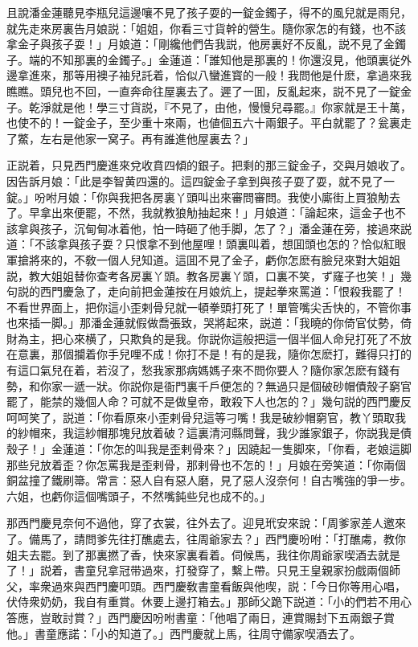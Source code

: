 且說潘金蓮聽見李瓶兒這邊嚷不見了孩子耍的一錠金鐲子，得不的風兒就是雨兒，就先走來房裏告月娘説：「姐姐，你看三寸貨幹的營生。隨你家怎的有錢，也不該拿金子與孩子耍！」月娘道：「剛纔他們告我説，他房裏好不反亂，説不見了金鐲子。端的不知那裏的金鐲子。」金蓮道：「誰知他是那裏的！你還沒見，他頭裏従外邊拿進來，那等用襖子袖兒託着，恰似八蠻進寳的一般！我問他是什麽，拿過來我瞧瞧。頭兒也不回，一直奔命往屋裏去了。遲了一囬，反亂起來，説不見了一錠金子。乾淨就是他！學三寸貨説，『不見了，由他，慢慢兒尋罷。』你家就是王十萬，也使不的！一錠金子，至少重十來兩，也値個五六十兩銀子。平白就罷了？瓮裏走了鱉，左右是他家一窝子。再有誰進他屋裏去？」

正説着，只見西門慶進來兌收賁四傾的銀子。把剩的那三錠金子，交與月娘收了。因告訴月娘：「此是李智黄四還的。這四錠金子拿到與孩子耍了耍，就不見了一錠。」吩咐月娘：「你與我把各房裏丫頭叫出來審問審問。我使小廝街上買狼觔去了。早拿出來便罷，不然，我就教狼觔抽起來！」月娘道：「論起來，這金子也不該拿與孩子，沉甸甸冰着他，怕一時砸了他手脚，怎了？」潘金蓮在旁，接過來説道：「不該拿與孩子耍？只恨拿不到他屋哩！頭裏叫着，想囬頭也怎的？恰似紅眼軍搶將來的，不敎一個人兒知道。這囬不見了金子，虧你怎麽有臉兒來對大姐姐説，教大姐姐替你查考各房裏丫頭。教各房裏丫頭，口裏不笑，ず窿子也笑！」幾句説的西門慶急了，走向前把金蓮按在月娘炕上，提起拳來罵道：「恨殺我罷了！不看世界面上，把你這小歪剌骨兒就一頓拳頭打死了！單管嘴尖舌快的，不管你事也來插一脚。」那潘金蓮就假做喬張致，哭將起來，説道：「我曉的你倚官仗勢，倚財為主，把心來横了，只欺負的是我。你説你這般把這一個半個人命兒打死了不放在意裏，那個攔着你手兒哩不成！你打不是！有的是我，隨你怎麽打，難得只打的有這口氣兒在着，若沒了，愁我家那病媽媽子來不問你要人？隨你家怎麽有錢有勢，和你家一遞一狀。你説你是衙門裏千戶便怎的？無過只是個破砂帽債殼子窮官罷了，能禁的幾個人命？可就不是做皇帝，敢殺下人也怎的？」幾句説的西門慶反呵呵笑了，説道：「你看原來小歪剌骨兒這等刁嘴！我是破紗帽窮官，教丫頭取我的紗帽來，我這紗帽那塊兒放着破？這裏清河縣問聲，我少誰家銀子，你説我是債殼子！」金蓮道：「你怎的叫我是歪剌骨來？」因蹺起一隻脚來，「你看，老娘這脚那些兒放着歪？你怎罵我是歪剌骨，那剌骨也不怎的！」月娘在旁笑道：「你兩個銅盆撞了鐵刷箒。常言：惡人自有惡人磨，見了惡人沒奈何！自古嘴強的爭一步。六姐，也虧你這個嘴頭子，不然嘴鈍些兒也成不的。」

那西門慶見奈何不過他，穿了衣裳，往外去了。迎見玳安來說：「周爹家差人邀來了。備馬了，請問爹先往打醮處去，往周爺家去？」西門慶吩咐：「打醮䖏，教你姐夫去罷。到了那裏撚了香，快來家裏看着。伺候馬，我往你周爺家喫酒去就是了！」説着，書童兒拿冠带過來，打發穿了，繫上帶。只見王皇親家扮戲兩個師父，率衆過來與西門慶叩頭。西門慶敎書童看飯與他喫，説：「今日你等用心唱，伏侍衆奶奶，我自有重賞。休要上邊打箱去。」那師父跪下説道：「小的們若不用心答應，豈敢討賞？」西門慶因吩咐書童：「他唱了兩日，連賞賜封下五兩銀子賞他。」書童應諾：「小的知道了。」西門慶就上馬，往周守備家喫酒去了。

